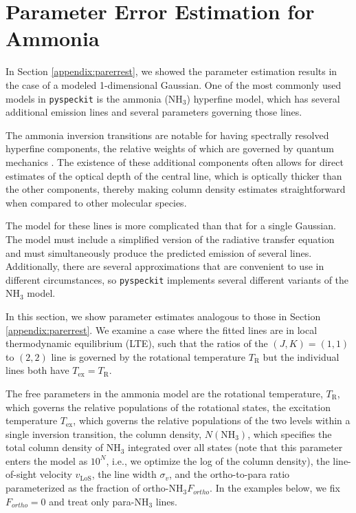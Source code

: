 \documentclass[twocolumn]{aastex62}
\newcommand{\pyspeckit}{\texttt{pyspeckit}\xspace}
\newcommand{\ammonia}{\ensuremath{\mathrm{NH}_3}\xspace}
\begin{document}
\section{Parameter Error Estimation for Ammonia}
\label{appendix:parerrestammonia}
In Section \ref{appendix:parerrest}, we showed the parameter estimation results
in the case of a modeled 1-dimensional Gaussian.  One of the most commonly used
models in \pyspeckit is the ammonia (\ammonia) hyperfine model, which has several
additional emission lines and several parameters governing those lines.

The ammonia inversion transitions are notable for having spectrally resolved
hyperfine components, the relative weights of which are governed by quantum
mechanics \citep{mangum15}. The existence of these additional components often
allows for direct estimates of the optical depth of the central line, which is
optically thicker than the other components, thereby making column density
estimates straightforward when compared to other molecular species.

The model for these lines is more complicated than that for a single Gaussian.
The model must include a simplified version of the radiative transfer equation
and must simultaneously produce the predicted emission of several lines.
Additionally, there are several approximations that are convenient to use
in different circumstances, so \pyspeckit implements several different
variants of the \ammonia model.

In this section, we show parameter estimates analogous to those in Section
\ref{appendix:parerrest}.
We examine a case where the fitted lines are in local
thermodynamic equilibrium (LTE), such that the ratios of the $(J,K)=(1,1)$
to $(2,2)$ line is governed by the rotational temperature $T_\mathrm{R}$ but
the individual lines both have $T_{\mathrm{ex}}=T_{\mathrm{R}}$.

The free parameters in the ammonia model are the rotational temperature,
$T_{\mathrm{R}}$, which governs the relative populations of the rotational
states, the excitation temperature $T_{\mathrm{ex}}$, which governs the
relative populations of the two levels within a single inversion transition,
the column density, $N(\ammonia)$, which specifies the total column density of
\ammonia integrated over all states (note that this parameter enters the model
as $10^N$, i.e., we optimize the log of the column density), the line-of-sight
velocity $v_\mathrm{LoS}$, the line width $\sigma_v$, and the ortho-to-para
ratio parameterized as the fraction of ortho-\ammonia $F_{ortho}$.  In the
examples below, we fix $F_{ortho}=0$ and treat only para-\ammonia lines.
\end{document}
